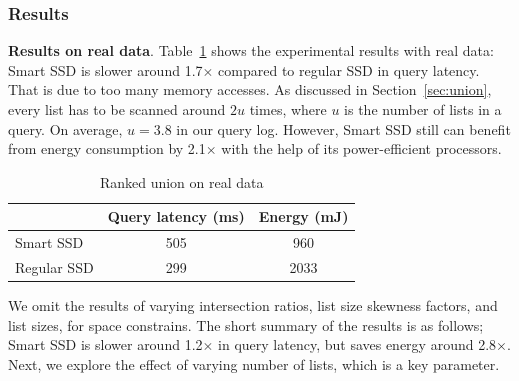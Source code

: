 \subsubsection{Results}\label{sec:rankUnionResults}
\textbf{Results on real data}.
Table~\ref{tab:unionRealData} shows the experimental results with real data: Smart SSD is slower around 1.7$\times$ compared to regular SSD in query latency. That is due to too many memory accesses. As discussed in Section~\ref{sec:union}, every list has to be scanned around $2u$ times, where $u$ is the number of lists in a query. On average, $u=3.8$ in our query log. However, Smart SSD still can benefit from energy consumption by 2.1$\times$ with the help of its power-efficient processors.


\begin{table}[tbp]\small
\centering
\begin{tabular}{l|c|c}\hline\hline
& \textbf{Query latency (ms)} & \textbf{Energy (mJ)}\\\hline
Smart SSD & 505 & 960 \\\hline
Regular SSD & 299 & 2033  \\\hline\hline
\end{tabular}
\caption{Ranked union on real data}\label{tab:unionRealData}
\end{table}

We omit the results of varying intersection ratios, list size skewness factors, and list sizes, for space constrains. The short summary of the results is as follows; Smart SSD is slower around 1.2$\times$ in query latency, but saves energy around 2.8$\times$. Next, we explore the effect of varying number of lists, which is a key parameter.

